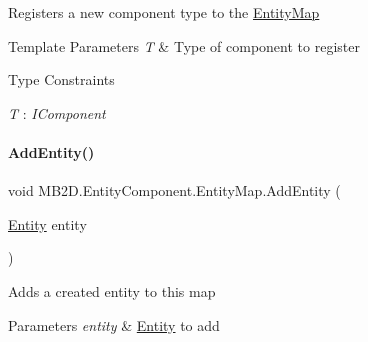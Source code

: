 Registers a new component type to the \hyperlink{class_m_b2_d_1_1_entity_component_1_1_entity_map}{Entity\+Map} 


\begin{DoxyTemplParams}{Template Parameters}
{\em T} & Type of component to register\\
\hline
\end{DoxyTemplParams}
\begin{Desc}
\item[Type Constraints]\begin{description}
\item[{\em T} : {\em I\+Component}]\end{description}
\end{Desc}
\hypertarget{class_m_b2_d_1_1_entity_component_1_1_entity_map_a0800ef900f92c04902d5b1c355aab900}{}\label{class_m_b2_d_1_1_entity_component_1_1_entity_map_a0800ef900f92c04902d5b1c355aab900} 
\paragraph{\texorpdfstring{Add\+Entity()}{AddEntity()}}
{\footnotesize\ttfamily void M\+B2\+D.\+Entity\+Component.\+Entity\+Map.\+Add\+Entity (\begin{DoxyParamCaption}\item[{\hyperlink{class_m_b2_d_1_1_entity_component_1_1_entity}{Entity}}]{entity }\end{DoxyParamCaption})\hspace{0.3cm}{\ttfamily [inline]}}



Adds a created entity to this map 


\begin{DoxyParams}{Parameters}
{\em entity} & \hyperlink{class_m_b2_d_1_1_entity_component_1_1_entity}{Entity} to add\\
\hline
\end{DoxyParams}
\hypertarget{class_m_b2_d_1_1_entity_component_1_1_entity_map_af2aefc425308f1ca680b0083f3acab0d}{}\label{class_m_b2_d_1_1_entity_component_1_1_entity_map_af2aefc425308f1ca680b0083f3acab0d} 
